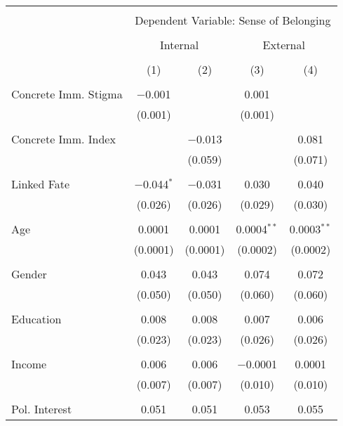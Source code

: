 
\begin{table}[!htbp] \centering 
  \caption{} 
  \label{} 
\begin{tabular}{@{\extracolsep{5pt}}lcccc} 
\\[-1.8ex]\hline 
\hline \\[-1.8ex] 
 & \multicolumn{4}{c}{Dependent Variable: Sense of Belonging} \\ 
\cline{2-5} 
\\[-1.8ex] & \multicolumn{2}{c}{Internal} & \multicolumn{2}{c}{External} \\ 
\\[-1.8ex] & (1) & (2) & (3) & (4)\\ 
\hline \\[-1.8ex] 
 Concrete Imm. Stigma & $-$0.001 &  & 0.001 &  \\ 
  & (0.001) &  & (0.001) &  \\ 
  & & & & \\ 
 Concrete Imm. Index &  & $-$0.013 &  & 0.081 \\ 
  &  & (0.059) &  & (0.071) \\ 
  & & & & \\ 
 Linked Fate & $-$0.044$^{*}$ & $-$0.031 & 0.030 & 0.040 \\ 
  & (0.026) & (0.026) & (0.029) & (0.030) \\ 
  & & & & \\ 
 Age & 0.0001 & 0.0001 & 0.0004$^{**}$ & 0.0003$^{**}$ \\ 
  & (0.0001) & (0.0001) & (0.0002) & (0.0002) \\ 
  & & & & \\ 
 Gender & 0.043 & 0.043 & 0.074 & 0.072 \\ 
  & (0.050) & (0.050) & (0.060) & (0.060) \\ 
  & & & & \\ 
 Education & 0.008 & 0.008 & 0.007 & 0.006 \\ 
  & (0.023) & (0.023) & (0.026) & (0.026) \\ 
  & & & & \\ 
 Income & 0.006 & 0.006 & $-$0.0001 & 0.0001 \\ 
  & (0.007) & (0.007) & (0.010) & (0.010) \\ 
  & & & & \\ 
 Pol. Interest & 0.051 & 0.051 & 0.053 & 0.055 \\ 

\end{tabular}
\end{table}
